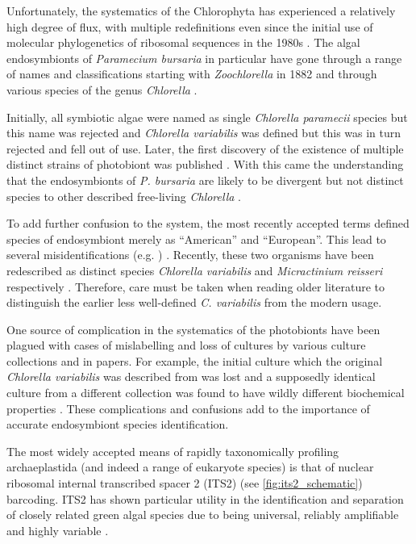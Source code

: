 
Unfortunately, the systematics of the Chlorophyta has experienced a relatively
high degree of flux, with multiple redefinitions even since the initial 
use of molecular phylogenetics of ribosomal sequences \citep{Hori1985,Gunderson1987}
in the 1980s \citep{Leliaert2012,Hoshina2010}.  The algal endosymbionts of
\textit{Paramecium bursaria} in particular have gone through a range of 
names and classifications starting with \textit{Zoochlorella} in 1882 and
through various species of the genus \textit{Chlorella} \citep{Hoshina2010}.

Initially, all symbiotic algae were named as single \textit{Chlorella paramecii}
species but this name was rejected and \textit{Chlorella variabilis} 
was defined \citep{shihira1965chlorella} but this was in turn rejected and fell out of use.
Later, the first discovery of the existence of multiple distinct strains of photobiont was published \citep{Douglas1986}.
With this came the understanding that the endosymbionts of \textit{P. bursaria}
are likely to be divergent but not distinct species to other described
free-living \textit{Chlorella} \citep{Hoshina2010}.

To add further confusion to the system, the most recently
accepted terms defined species of endosymbiont merely 
as ``American'' and ``European''.  This lead to several
misidentifications (e.g. \citep{Kodama2007}) \citep{Hoshina2010}.
Recently, these two organisms have been redescribed as
distinct species \textit{Chlorella variabilis} and
\textit{Micractinium reisseri} respectively \citep{Hoshina2010}.
Therefore, care must be taken when reading older literature
to distinguish the earlier less well-defined \textit{C. variabilis}
from the modern usage.

One source of complication in the systematics of the photobionts have been
plagued with cases of mislabelling and loss of cultures
by various culture collections and in papers. For example, the initial culture
which the original \textit{Chlorella variabilis} was described from was lost
and a supposedly identical culture from a different collection
was found to have wildly different biochemical properties \citep{Hoshina2010}.
These complications and confusions add to the importance
of accurate endosymbiont species identification. 


The most widely accepted means of rapidly taxonomically profiling
archaeplastida (and indeed a range of eukaryote species) is that of 
nuclear ribosomal internal transcribed spacer 2 (ITS2) (see \cref{fig:its2_schematic}) barcoding. 
ITS2 has shown particular utility in the identification and separation
of closely related green algal species \citep{Buchheim2011,Heeg2015} due to being
universal, reliably amplifiable and highly variable \citep{Hershkovitz1996}.

